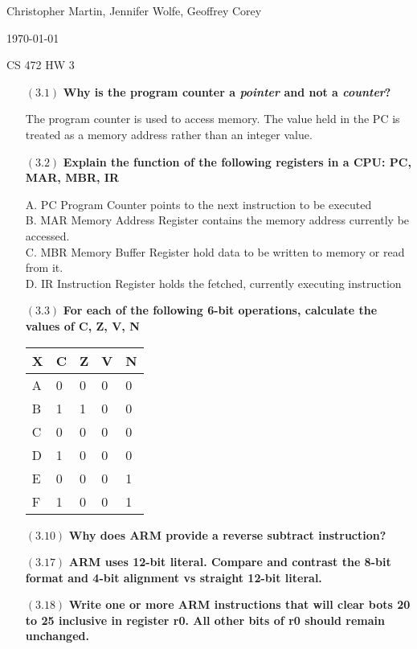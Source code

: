 \documentclass[letterpaper,10pt,titlepage]{article}
\def\name{Christopher Martin, Jennifer Wolfe, Geoffrey Corey}
\begin{document}
\hfill \name

\hfill \today

\hfill CS 472 HW 3

\begin{enumerate}
\item[$(3.1)$] \textbf{Why is the program counter a \textit{pointer} and not a \textit{counter}?}

  The program counter is used to access memory. The value held in the PC is treated as a memory address rather than an integer value.   

\item[$(3.2)$] \textbf{Explain the function of the following registers in a CPU: PC, MAR, MBR, IR}

A. PC Program Counter points to the next instruction to be executed\\
B. MAR Memory Address Register contains the memory address currently be accessed. \\
C. MBR Memory Buffer Register hold data to be written to memory or read from it.\\
D. IR Instruction Register holds the fetched, currently executing instruction
  
\item[$(3.3)$] \textbf{For each of the following 6-bit operations, calculate the values of C, Z, V, N}

\begin{tabular}{| l | l | l | l | l |}
	\hline
	X & C & Z & V & N \\ \hline
	A & 0 & 0 & 0 & 0 \\ \hline
	B & 1 & 1 & 0 & 0 \\ \hline
	C & 0 & 0 & 0 & 0 \\ \hline
	D & 1 & 0 & 0 & 0 \\ \hline 
	E & 0 & 0 & 0 & 1 \\ \hline 
	F & 1 & 0 & 0 & 1 \\ \hline 
	\end{tabular}

  
\item[$(3.10)$] \textbf{Why does ARM provide a reverse subtract instruction?}



\item[$(3.17)$] \textbf{ARM uses 12-bit literal. Compare and contrast the 8-bit format and 4-bit alignment vs straight 12-bit literal.}


  
\item[$(3.18)$] \textbf{Write one or more ARM instructions that will clear bots 20 to 25 inclusive in register r0. All other bits of r0 should remain unchanged.}




\end{enumerate}
\end{document}

